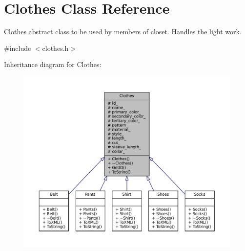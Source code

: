 \hypertarget{classClothes}{}\section{Clothes Class Reference}
\label{classClothes}


\mbox{\hyperlink{classClothes}{Clothes}} abstract class to be used by members of closet. Handles the light work.  




{\ttfamily \#include $<$clothes.\+h$>$}



Inheritance diagram for Clothes\+:\nopagebreak
\begin{figure}[H]
\begin{center}
\leavevmode
\includegraphics[width=350pt]{classClothes__inherit__graph}
\end{center}
\end{figure}



